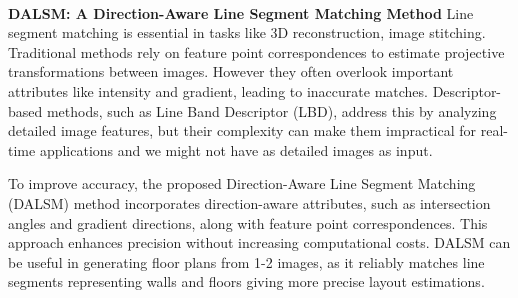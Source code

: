 \paragraph{}

\textbf{DALSM: A Direction-Aware Line Segment Matching Method}
Line segment matching is essential in tasks like 3D reconstruction, image stitching. Traditional methods rely on feature point correspondences to estimate projective transformations between images. 
However they often overlook important attributes like intensity and gradient, leading to inaccurate matches. 
Descriptor-based methods, such as Line Band Descriptor (LBD), address this by analyzing detailed image features, but their complexity can make them impractical for real-time applications and we might not have as detailed images as input.

To improve accuracy, the proposed Direction-Aware Line Segment Matching (DALSM) method incorporates direction-aware attributes, such as intersection angles and gradient directions, along with feature point correspondences. 
This approach enhances precision without increasing computational costs. 
DALSM can be useful in generating floor plans from 1-2 images, as it reliably matches line segments representing walls and floors giving more precise layout estimations.
